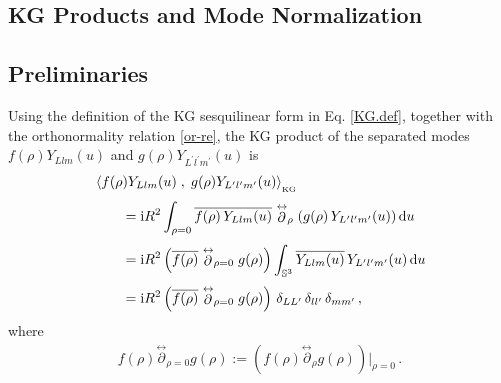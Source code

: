 \documentclass[aps,twocolumn,nofootinbib]{revtex4}
\begin{document}
{\begin{appendix}
\section{KG Products and Mode Normalization}\label{App. KGNorm}


\subsection{Preliminaries}

Using the definition of the KG sesquilinear form in Eq. \eqref{KG.def}, together with the orthonormality relation \eqref{or-re}, the KG product of the separated modes $f(\rho)Y_{Llm}(u)$ and $g(\rho)Y_{L^\prime l^\prime m^\prime}(u)$ is
\begin{align} \label{KGN-general}
    &\left\langle f(\rho)Y_{Llm}(u) \;,\; g(\rho)Y_{L^\prime l^\prime m^\prime}(u) \right\rangle_{\vphantom{}_{\text{KG}}}\nonumber\\[3pt]
    &\qquad = \mathrm{i}R^2 \int_{\rho=0} \overline{f(\rho)\,Y_{Llm}(u)} \stackrel{\leftrightarrow}{\partial}_{\rho}
    \left( g(\rho)\,Y_{L^\prime l^\prime m^\prime}(u) \right) {\mathrm{d}}u\nonumber\\[3pt]
    &\qquad = \mathrm{i}R^2 \left( \overline{f(\rho)} \stackrel{\leftrightarrow}{\partial}_{\rho=0} g(\rho) \right) \int_{{\mathbb{S}}^3} \overline{Y_{Llm}(u)}\, Y_{L^\prime l^\prime m^\prime }(u)\,{\mathrm{d}}u \nonumber\\[3pt]
    &\qquad = \mathrm{i} R^2 \left(\overline{f(\rho)} \stackrel{\leftrightarrow}{\partial}_{\rho=0} g(\rho) \right) \,\delta_{LL^\prime} \,\delta_{ll^\prime} \,\delta_{mm^\prime}\,, 
\end{align}
where 
\begin{align}\label{miriam3}
    f(\rho) \stackrel{\leftrightarrow}{\partial}_{\rho=0} g(\rho) := \left( f(\rho) \stackrel{\leftrightarrow}{\partial}_{\rho} g(\rho) \right)\Big|_{\rho=0} \,.
\end{align}


\end{appendix}}
\end{document}

